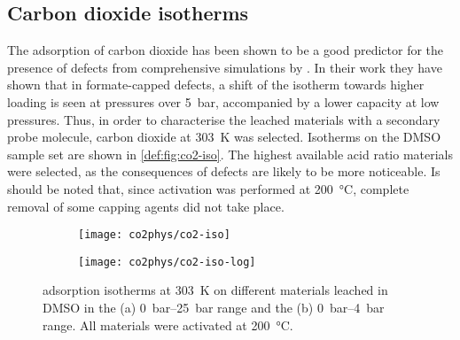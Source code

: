 
\subsection{Carbon dioxide isotherms}\label{def:co2}

The adsorption of carbon dioxide has been shown to be a good 
predictor for the presence of defects from comprehensive simulations
by \citet{thorntonDefectsMetalOrganic2016}.
In their work they have shown that in formate-capped defects, 
a shift of the  isotherm towards
higher loading is seen at pressures over \SI{5}{\bar}, accompanied 
by a lower capacity at low pressures. Thus, in order to characterise
the leached materials with a secondary probe molecule, carbon dioxide
at \SI{303}{\kelvin} was selected. Isotherms on the DMSO sample 
set are shown in \autoref{def:fig:co2-iso}. The highest available 
acid ratio materials were selected, as the consequences of defects 
are likely to be more noticeable. Is should be noted that, since
activation was performed at \SI{200}{\degreeCelsius}, complete removal 
of some capping agents did not take place.

\begin{figure}[htb]
    \centering

    \begin{subfigure}{0.5\linewidth}
		\texttt{[image: co2phys/co2-iso]}%
		\caption{}%
		\label{def:fig:co2-iso-reg}
	\end{subfigure}%
	\begin{subfigure}{0.5\linewidth}
		\texttt{[image: co2phys/co2-iso-log]}%
		\caption{}%
		\label{def:fig:co2-iso-log}
	\end{subfigure}%

    \caption{
         adsorption isotherms at \SI{303}{\kelvin} on different
        materials leached in DMSO in the (a) \SIrange{0}{25}{\bar} range
        and the (b) \SIrange{0}{4}{\bar} range. All materials were 
        activated at \SI{200}{\degreeCelsius}.
    }\label{def:fig:co2-iso}
\end{figure}

